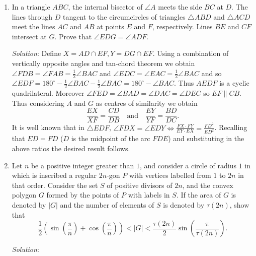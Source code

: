 \documentclass{article}
\begin{document}
\begin{enumerate}[1.]
\item %
In a triangle $ABC$, the internal bisector of $\angle A$ meets the side $BC$ at $D$.
The lines through $D$ tangent to the circumcircles of triangles $\triangle ABD$ and $\triangle ACD$ meet the lines $AC$ and $AB$ at points $E$ and $F$, respectively.
Lines $BE$ and $CF$ intersect at $G$.
Prove that $\angle EDG = \angle ADF$.

\textit{Solution}:
Define $X= AD \cap EF, Y = DG \cap EF $.
Using a combination of vertically opposite angles and tan-chord theorem we obtain $\angle FDB = \angle FAB =\frac{1}{2} \angle BAC $ and $\angle EDC = \angle EAC =\frac{1}{2} \angle BAC $ and so $\angle EDF = 180^\circ -\frac{1}{2}\angle BAC -\frac{1}{2}\angle BAC= 180^\circ - \angle BAC$.
Thus $AEDF$ is a cyclic quadrilateral.
Moreover $\angle FED =\angle BAD = \angle DAC= \angle DEC$ so $EF \parallel CB$.
Thus considering $A$ and $G$ as centres of similarity we obtain 
\[
  \frac{EX}{XF} = \frac{CD}{DB} \quad \text{and} \quad \frac{EY}{YF} =\frac{BD}{DC}.
\]
It is well known that in $\triangle EDF $, $\angle FDX = \angle EDY \Leftrightarrow \frac{FX \cdot FY}{ EY \cdot EX} = \frac{FD^2}{ED^2}$.
Recalling that $ED = FD$ ($D$ is the midpoint of the arc $FDE$) and substituting in the above ratios the desired result follows.  


\item %
\newcommand{\parens}[1]{\left(#1\right)}
Let $n$ be a positive integer greater than $1$, and consider a circle of radius $1$ in which is inscribed a regular $2n$-gon $P$ with vertices labelled from $1$ to $2n$ in that order.
Consider the set $S$ of positive divisors of $2n$, and the convex polygon $G$ formed by the points of $P$ with labels in $S$.
If the area of $G$ is denoted by $|G|$ and the number of elements of $S$ is denoted by $\tau(2n)$, show that
\[ \frac{1}{2} \parens{\sin\parens{\frac{\pi}{n}} +\cos\parens{\frac{\pi}{n}}} < |G| < \frac{\tau(2n)}{2} \sin\parens{\frac{\pi}{\tau(2n)}}. \]

\textit{Solution}:


\end{enumerate}
\end{document}
